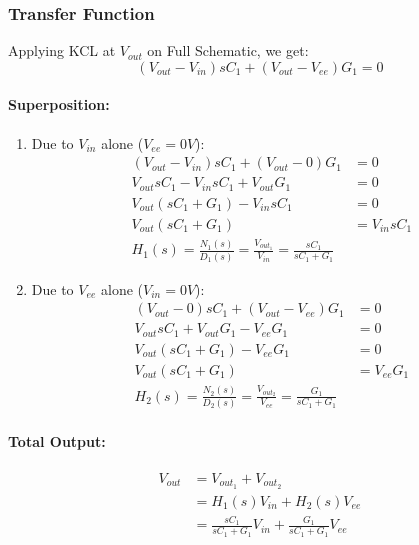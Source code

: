 \subsubsection{Transfer Function}
Applying KCL at $V_{out}$ on Full Schematic, we get:
\[
  (V_{out} - V_{in}){sC_1} + (V_{out} - V_{ee}){G_1} = 0
\]
\paragraph{Superposition:}
\begin{enumerate}
  \item Due to \(V_{in}\) alone (\(V_{ee} = 0V\)):
    \begin{align*}
      (V_{out} - V_{in}){sC_1} + (V_{out} - 0){G_1} &= 0 \\
      V_{out}sC_1 - V_{in}sC_1 + V_{out}G_1 &= 0 \\
      V_{out}(sC_1 + G_1) - V_{in}sC_1 &= 0 \\
      V_{out}(sC_1 + G_1) &= V_{in}sC_1 \\
      \boxed{H_1(s) = \frac{N_1(s)}{D_1(s)} = \frac{V_{out_1}}{V_{in}} = \frac{sC_1}{sC_1 + G_1}}
    \end{align*}
  \item Due to \(V_{ee}\) alone (\(V_{in} = 0V\)):
    \begin{align*}
      (V_{out} - 0){sC_1} + (V_{out} - V_{ee}){G_1} &= 0 \\
      V_{out}sC_1 + V_{out}G_1 - V_{ee}G_1 &= 0 \\
      V_{out}(sC_1 + G_1) - V_{ee}G_1 &= 0 \\
      V_{out}(sC_1 + G_1) &= V_{ee}G_1 \\
      \boxed{H_2(s) = \frac{N_2(s)}{D_2(s)} = \frac{V_{out_2}}{V_{ee}} = \frac{G_1}{sC_1 + G_1}}
    \end{align*}
\end{enumerate}
\paragraph{Total Output:}
\begin{align*}
  V_{out} &= V_{out_1} + V_{out_2} \\
  &= H_1(s) V_{in} + H_2(s) V_{ee} \\
  &= \frac{sC_1}{sC_1 + G_1} V_{in} + \frac{G_1}{sC_1 + G_1} V_{ee}
\end{align*}

